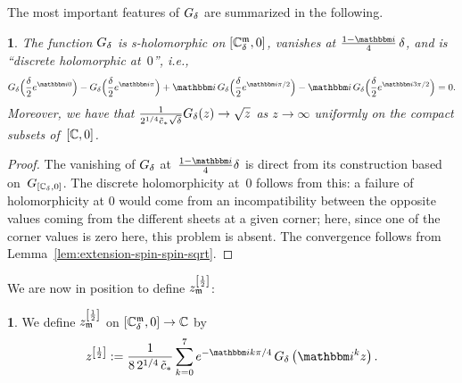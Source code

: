 \documentclass[12pt,oneside,english]{amsart}
\numberwithin{equation}{section}
\numberwithin{figure}{section}
\theoremstyle{plain}
\theoremstyle{plain}
\theoremstyle{plain}
\newtheorem{prop}[thm]{\protect\propositionname}
\theoremstyle{plain}
\theoremstyle{remark}
\theoremstyle{definition}
\newtheorem{defn}[thm]{\protect\definitionname}
\theoremstyle{plain}
\theoremstyle{plain}
\numberwithin{thm}{section}
\newcommand{\kallemod}[1]{{\color{kallecol} {#1}}}
\providecommand{\definitionname}{Definition}
\providecommand{\propositionname}{Proposition}
\providecommand{\definitionname}{Definition}
\providecommand{\propositionname}{Proposition}
\providecommand{\definitionname}{Definition}
\providecommand{\propositionname}{Proposition}
\providecommand{\definitionname}{Definition}
\providecommand{\propositionname}{Proposition}
\begin{document}
The most important features of $G_{{\delta}}$ are summarized in the
following.
\begin{prop}
\label{prop:g-sqrt}The function $G_{{\delta}}$ is s-holomorphic on
${\left[ {\mathbb{C}_{{\delta}}^{\mathfrak{m}}}, 0 \right]}$, vanishes at $\frac{1-\ii}{4} \, \meshsz$,
and is ``discrete holomorphic at~$0$'', i.e.,
\[ G_{\meshsz} \Big(\frac{\meshsz}{2} e^{\ii 0} \Big)
- G_{\meshsz} \Big(\frac{\meshsz}{2} e^{\ii \pi} \Big)
+ \ii \, G_{\meshsz} \Big(\frac{\meshsz}{2} e^{\ii \pi / 2} \Big)
- \ii \, G_{\meshsz} \Big(\frac{\meshsz}{2} e^{\ii 3 \pi / 2} \Big)
       = 0 . \]
Moreover, we have that 
$\frac{1}{2^{1/4} \tilde{c}_{*} \sqrt{{\delta}}}G_{{\delta}}(z)  \to \sqrt{z}$
as $z \to \infty$ uniformly on the compact subsets of~${\left[ \mathbb{C},0 \right]}$.
\end{prop}
\begin{proof}
The vanishing of $G_{{\delta}}$ at~$\frac{1-\ii}{4}\meshsz$ is direct from its 
construction based on~$G_{{\left[ {\mathbb{C}_{{\delta}}}, 0 \right]}}$.
The discrete holomorphicity at~$0$ follows from this: a failure of 
holomorphicity
at $0$ would come from an incompatibility between the opposite values
coming from the different sheets at a given corner; here, since one
of the corner values is zero here, this problem is absent. The convergence
follows from Lemma~\ref{lem:extension-spin-spin-sqrt}. 
\end{proof}

We are now in position to define $z_{\mathfrak{m}}^{\left[\frac{1}{2}\right]}$: 
\begin{defn}
\label{def:discrete-square-root}We define $z_{\mathfrak{m}}^{\left[\frac{1}{2}\right]}$
on ${\left[ {\mathbb{C}_{{\delta}}^{\mathfrak{m}}}, 0 \right]} \to \mathbb{C} $ by 
\[
z^{\left[\frac{1}{2}\right]} 
:= \frac{1}{8 \, 2^{1/4} \, \tilde{c}_*}
    \sum_{k=0}^{7} e^{-\ii k \pi / 4} \,
    G_{\meshsz}\left(\ii^{k}z\right).
\]
\end{defn}
\end{document}
